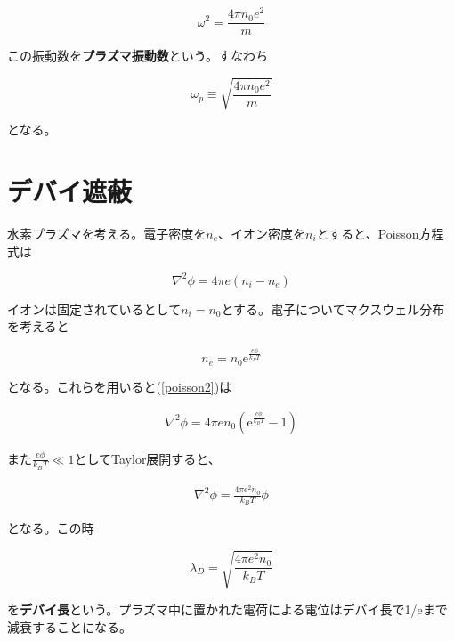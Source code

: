 \documentclass[18pt]{jsarticle}
\begin{document}
\begin{equation}
    \omega^2 = \frac{4\pi n_0 e^2}{m}
\end{equation}

この振動数を\textbf{プラズマ振動数}という。すなわち

\begin{equation}
    \omega_p \equiv \sqrt{\frac{4\pi n_0 e^2}{m}}
\end{equation}

となる。

\section{デバイ遮蔽}
\par 水素プラズマを考える。電子密度を$n_e$、イオン密度を$n_i$とすると、Poisson方程式は

\begin{equation}
    \label{poisson2}
    \nabla^2 \phi = 4\pi e(n_i-n_e)
\end{equation}

イオンは固定されているとして$n_i=n_0$とする。電子についてマクスウェル分布を考えると

\begin{equation}
    n_e = n_0 \mathrm{e}^{\frac{e\phi}{k_B T}}
\end{equation}

となる。これらを用いると(\ref{poisson2})は

\begin{eqnarray}
    \nabla^2 \phi = 4\pi en_0\left(\mathrm{e}^{\frac{e\phi}{k_B T}} -1 \right)
\end{eqnarray}

また$\frac{e\phi}{k_B T} \ll 1$としてTaylor展開すると、

\begin{eqnarray}
    \nabla^2 \phi = \frac{4\pi e^2 n_0}{k_B T}\phi
\end{eqnarray}

となる。この時

\begin{equation}
    \lambda_D = \sqrt{\frac{4\pi e^2 n_0}{k_B T}}
\end{equation}

を\textbf{デバイ長}という。プラズマ中に置かれた電荷による電位はデバイ長で1/eまで減衰することになる。
\end{document}
